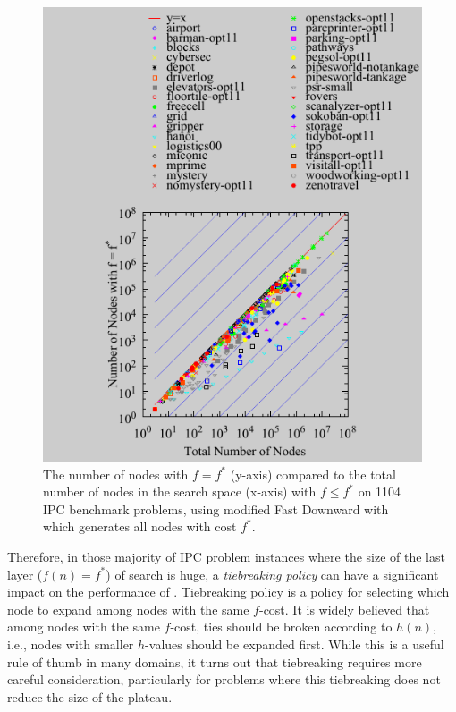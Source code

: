 \begin{figure}[htbp]
  \centering
  \includegraphics{tables/aaai16-frontier/aaai16prelim3/lmcut_frontier_noh-front.pdf}
 \caption{
 The number of nodes with $f=f^*$ (y-axis) compared to the
 total number of nodes in the search space (x-axis) with $f\leq f^*$ on 1104 IPC benchmark problems,
  using modified Fast Downward with \lmcut which 
  generates all nodes with cost $f^*$.
  }
 \label{fig:plateau-noh}
\end{figure}

Therefore, in those majority of IPC problem instances where the size of
the last layer ($f(n)=f^*$) of search is huge, a
\emph{tiebreaking policy} can have a significant impact on the
performance of \astar. Tiebreaking policy is a policy 
for selecting which node to expand among nodes with the same $f$-cost.
It is widely believed that among nodes with the same $f$-cost,
ties should be broken according to $h(n)$, i.e.,
nodes with smaller $h$-values should be expanded first.  While this is a
useful rule of thumb in many domains, it turns out that tiebreaking
requires more careful consideration, particularly for problems where
this tiebreaking does not reduce the size of the plateau.

